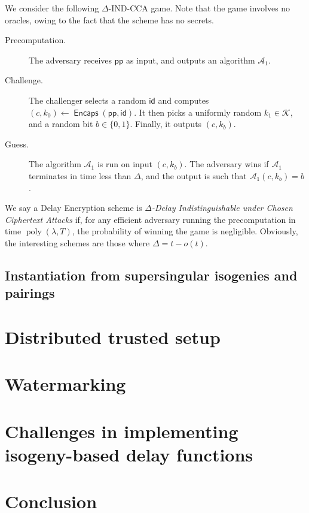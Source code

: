 \documentclass{llncs}
\DeclareMathOperator{\poly}{poly}
\DeclareMathOperator{\Encaps}{\mathsf{Encaps}}
\newcommand{\pp}{\mathsf{pp}}
\newcommand{\id}{\mathsf{id}}
\newcommand{\keyspace}{\mathcal{K}}
\begin{document}
We consider the following $\Delta$-IND-CCA game. %
Note that the game involves no oracles, owing to the fact that the
scheme has no secrets.

\begin{description}
\item[Precomputation.] The adversary receives $\pp$ as input, and
  outputs an algorithm $\mathcal{A}_1$. %
\item[Challenge.] The challenger selects a random $\id$ and computes
  $(c,k_0)\gets\Encaps(\pp,\id)$. %
  It then picks a uniformly random $k_1\in\keyspace$, and a random bit
  $b\in\{0,1\}$. %
  Finally, it outputs $(c,k_b)$.
\item[Guess.] The algorithm $\mathcal{A}_1$ is run on input
  $(c,k_b)$. %
  The adversary wins if $\mathcal{A}_1$ terminates in time less than
  $\Delta$, and the output is such that $\mathcal{A}_1(c,k_b) = b$.
\end{description}

We say a Delay Encryption scheme is \emph{$\Delta$-Delay
  Indistinguishable under Chosen Ciphertext Attacks} if, for any
efficient adversary running the precomputation in time
$\poly(\lambda,T)$, the probability of winning the game is
negligible. %
Obviously, the interesting schemes are those where $\Delta = t-o(t)$.

\subsection{Instantiation from supersingular isogenies and pairings}



\section{Distributed trusted setup}
\label{sec:distr-trust-setup}

\section{Watermarking}
\label{sec:watermarking}

\section{Challenges in implementing isogeny-based delay functions}
\label{sec:secure-impl-isog}

\section{Conclusion}



\end{document}
